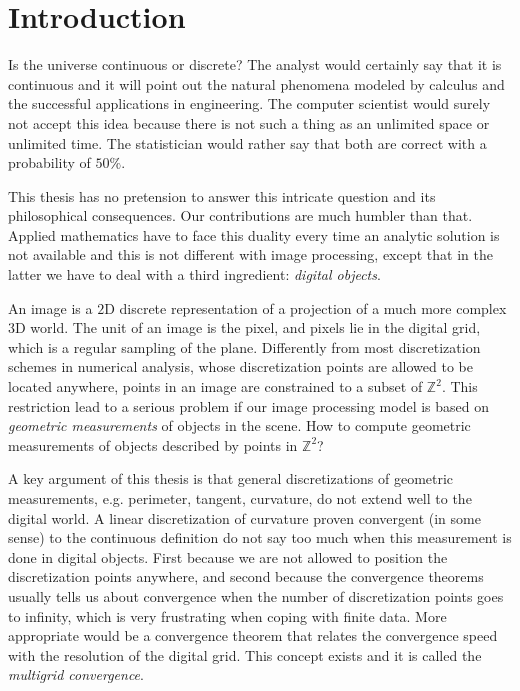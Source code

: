 \chapter*{Introduction}\label{chapter:introduction}


Is the universe continuous or discrete? The analyst would certainly say that it is continuous and it will point out the natural phenomena modeled by calculus and the successful applications in engineering. The computer scientist would surely not accept this idea because there is not such a thing as an unlimited space or unlimited time. The statistician would rather say that both are correct with a probability of $50\%$.

This thesis has no pretension to answer this intricate question and its philosophical consequences. Our contributions are much humbler than that. Applied mathematics have to face this duality every time an analytic solution is not available and this is not different with image processing, except that in the latter we have to deal with a third ingredient: \emph{digital objects}.

An image is a $2$D discrete representation of a projection of a much more complex $3$D world. The unit of an image is the pixel, and pixels lie in the digital grid, which is a regular sampling of the plane. Differently from most discretization schemes in numerical analysis, whose discretization points are allowed to be located anywhere, points in an image are constrained to a subset of $\mathbb{Z}^2$. This restriction lead to a serious problem if our image processing model is based on \emph{geometric measurements} of objects in the scene. How to compute geometric measurements of objects described by points in $\mathbb{Z}^2$?

A key argument of this thesis is that general discretizations of geometric measurements, e.g. perimeter, tangent, curvature, do not extend well to the digital world. A linear discretization of curvature proven convergent (in some sense) to the continuous definition do not say too much when this measurement is done in digital objects. First because we are not allowed to position the discretization points anywhere, and second because the convergence theorems usually tells us about convergence when the number of discretization points goes to infinity, which is very frustrating when coping with finite data. More appropriate would be a convergence theorem that relates the convergence speed with the resolution of the digital grid. This concept exists and it is called the \emph{multigrid convergence}.


